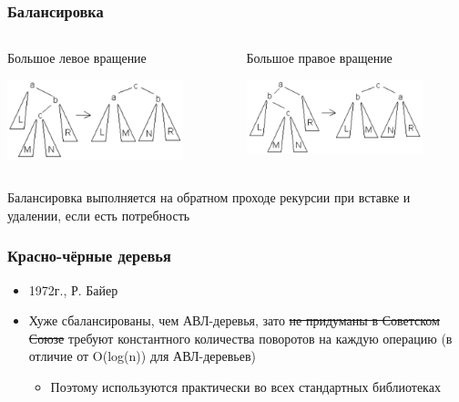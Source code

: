 \documentclass[xetex,mathserif,serif]{beamer}
\begin{document}
	\begin{frame}
		\frametitle{Балансировка}
		\begin{columns}
			\begin{column}{0.5\textwidth}
				Большое левое вращение

				\includegraphics[width=0.8\textwidth]{avlLargeLeft.png}
			\end{column}
			\begin{column}{0.5\textwidth}
				Большое правое вращение

				\includegraphics[width=0.8\textwidth]{avlLargeRight.png}
			\end{column}
		\end{columns}
		\vspace{3mm}
		Балансировка выполняется на обратном проходе рекурсии при вставке и удалении, если есть потребность
	\end{frame}

	\begin{frame}
		\frametitle{Красно-чёрные деревья}
		\begin{itemize}
			\item 1972г., Р. Байер
			\item Хуже сбалансированы, чем АВЛ-деревья, зато \sout{не придуманы в Советском Союзе} требуют константного количества поворотов на каждую операцию (в отличие от O(log(n)) для АВЛ-деревьев)
			\begin{itemize}
				\item Поэтому используются практически во всех стандартных библиотеках
			\end{itemize}
		\end{itemize}
	\end{frame}
\end{document}
